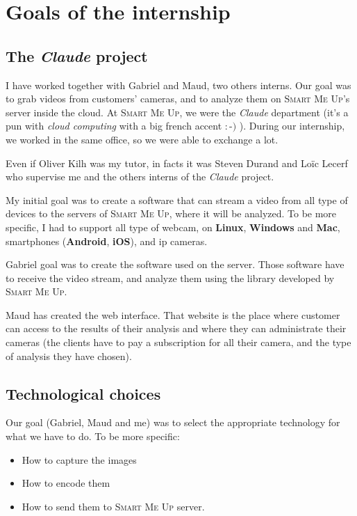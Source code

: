 \documentclass[a4paper,11pt]{custom}
\newcommand{\smu}{\textsc{Smart Me Up}}
\newcommand{\linux}{\textbf{Linux}\xspace}
\newcommand{\win}{\textbf{Windows}\xspace}
\newcommand{\mac}{\textbf{Mac}\xspace}
\newcommand{\android}{\textbf{Android}\xspace}
\newcommand{\ios}{\textbf{iOS}\xspace}
\newcommand{\claude}{\textit{Claude}\xspace}
\begin{document}
\chapter{Goals of the internship}

\section{The \claude{} project}

I have worked together with Gabriel and Maud, two others interns. Our goal was
to grab videos from customers' cameras, and to analyze them on \smu's server
inside the cloud. At \smu, we were the \claude{} department (it's a pun with
\textit{cloud computing} with a big french accent $:$-$)$ ). During our
internship, we worked in the same office, so we were able to exchange a lot.

Even if Oliver Kilh was my tutor, in facts it was Steven Durand and Loïc Lecerf
who supervise me and the others interns of the \claude{} project.

My initial goal was to create a software that can stream a video from all type of
devices to the servers of \smu, where it will be analyzed. To be more specific,
I had to support all type of webcam, on \linux, \win{} and \mac, smartphones
(\android, \ios), and ip cameras.

Gabriel goal was to create the software used on the server. Those software
have to receive the video stream, and analyze them using the library developed
by \smu.

Maud has created the web interface. That website is the place where customer can
access to the results of their analysis and where they can administrate their
cameras (the clients have to pay a subscription for all their camera, and the
type of analysis they have chosen).

\section{Technological choices}

Our goal (Gabriel, Maud and me) was to select the appropriate technology for
what we have to do. To be more specific:
\begin{itemize}
\item How to capture the images
\item How to encode them
\item How to send them to \smu{} server.
\end{itemize}
\end{document}

